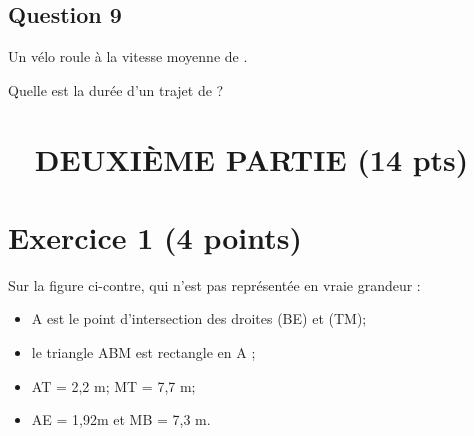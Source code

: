 \documentclass[12pt,a4paper,french]{article}
\begin{document}
\subsection*{Question 9}

Un vélo roule à la vitesse moyenne de .

Quelle est la durée d'un trajet de  ?

\section*{\hfill~ DEUXIÈME PARTIE (14 pts)\hfill~}

\section*{Exercice 1 (4 points)}

\begin{minipage}{0.45\linewidth}
	Sur la figure ci-contre, qui n'est pas représentée en vraie grandeur :
	\begin{itemize}
		\item A est le point d'intersection des droites (BE) et (TM);
		\item le triangle ABM est rectangle en A ;
		\item AT = 2,2 m; MT = 7,7 m;
		\item AE = 1,92m et MB = 7,3 m.
	\end{itemize}
\end{minipage}\hfill~
\medskip
\end{document}
